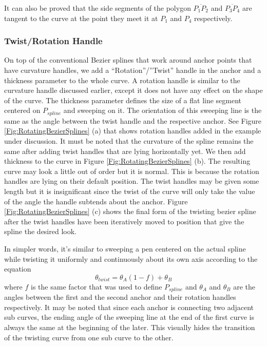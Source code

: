 It can also be proved that the side segments of the polygon $\overline{P_1 P_2}$ and $\overline{P_3 P_4}$ are tangent to the curve at the point they meet it at $P_1$ and $P_4$ respectively.


\subsubsection{Twist/Rotation Handle}
    On top of the conventional Bezier splines that work around anchor points that have curvature handles, we add a “Rotation”/”Twist” handle in the anchor and a thickness parameter to the whole curve. A rotation handle is similar to the curvature handle discussed earlier, except it does not have any effect on the shape of the curve. The thickness parameter defines the size of a flat line segment  centered on $P_{spline}$ and sweeping on it. The orientation of this sweeping line is the same as the angle between the twist handle and the respective anchor. See Figure \ref{Fig:RotatingBezierSplines} (a) that shows rotation handles added in the example under discussion. It must be noted that the curvature of the spline remains the same after adding twist handles that are lying horizontally yet. We then add thickness to the curve in Figure \ref{Fig:RotatingBezierSplines} (b). The resulting curve may look a little out of order but it is normal. This is because the rotation handles are lying on their default position. The twist handles may be given some length but it is insignificant since the twist of the curve will only take the value of the angle the handle subtends about the anchor. Figure \ref{Fig:RotatingBezierSplines} (c) shows the final form of the twisting bezier spline after the twist handles have been iteratively moved to position that give the spline the desired look.
        

    In simpler words, it’s similar to sweeping a pen centered on the actual spline while twisting it uniformly and continuously about its own axis according to the equation
    \begin{equation}
    \theta_{twist}=\theta_A  (1-f)+ \theta_B
    \end{equation}
    where $f$ is the same factor that was used to define $P_{spline}$ and $\theta_A$ and $\theta_B$ are the angles between the first and the second anchor and their rotation handles respectively. It may be noted that since each anchor is connecting two adjacent sub curves, the ending angle of the sweeping line at the end of the first curve is always the same at the beginning of the later. This visually hides the transition of the twisting curve from one sub curve to the other.


